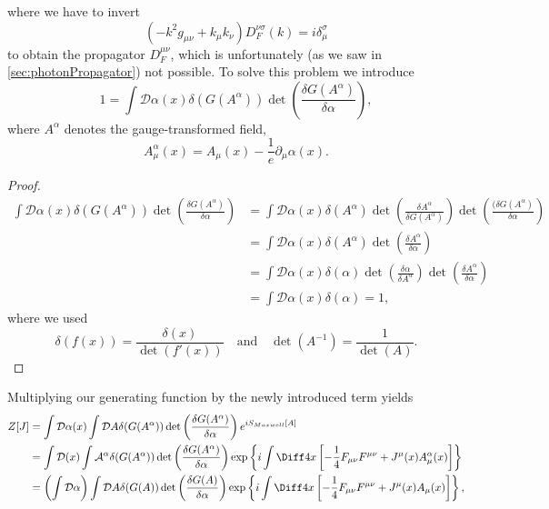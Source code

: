 where we have to invert
\begin{equation}
	(-k^2 g_{\mu\nu} + k_\mu k_\nu) D^{\nu \sigma}_F (k) = i \delta_\mu^\sigma
\end{equation}
to obtain the propagator $D^{\mu\nu}_F$, which is unfortunately (as we saw in \ref{sec:photonPropagator}) not possible. To solve this problem we introduce
\begin{equation}
	1 = \int \mathcal{D} \alpha(x) \delta(G(A^\alpha)) \det\left(\frac{\delta G(A^\alpha)}{\delta\alpha}\right),
\end{equation}
where $A^\alpha$ denotes the gauge-transformed field, 
\begin{equation}
	A^\alpha_\mu(x) = A_\mu(x) - \frac{1}{e} \partial_\mu \alpha(x).
\end{equation}
\begin{proof}
\begin{align}
	\int \mathcal{D} \alpha(x) \delta(G(A^\alpha)) \det\left(\frac{\delta G(A^\alpha)}{\delta\alpha}\right) &= \int\mathcal{D}\alpha(x) \delta(A^\alpha) \det\left(\frac{\delta A^\alpha}{\delta G(A^\alpha)}\right) \det\left(\frac{(\delta G(A^\alpha)}{\delta \alpha}\right) \\
	&= \int\mathcal{D}\alpha(x) \delta(A^\alpha) \det\left(\frac{\delta A^\alpha}{\delta \alpha}\right) \\
	&= \int\mathcal{D}\alpha(x) \delta(\alpha) \det\left(\frac{\delta \alpha}{\delta A^\alpha}\right) \det\left(\frac{\delta A^\alpha}{\delta \alpha}\right) \\
	&= \int \mathcal{D}\alpha(x) \delta(\alpha) = 1,
\end{align}
where we used 
\begin{equation}
	\delta(f(x)) = \frac{\delta(x)}{\det (f'(x))} \quad \text{and} \quad \det(A^{-1}) = \frac{1}{\det(A)}.
\end{equation}
\end{proof}
Multiplying our generating function by the newly introduced term yields
\begin{align}
	Z[J] &= \int \mathcal{D} \alpha(x) \int \mathcal{D} A \delta(G(A^\alpha)) \det\left(\frac{\delta G(A^\alpha)}{\delta \alpha}\right) e^{iS_{Maxwell}[A]} \\
	&= \int \mathcal{D}(x) \int \mathcal{A^\alpha} \delta(G(A^\alpha)) \det\left(\frac{\delta G(A^\alpha)}{\delta \alpha}\right) \exp \left\{ i \int\Diff4x \left[- \frac{1}{4}F_{\mu\nu}F^{\mu\nu} + J^\mu(x) A^\alpha_\mu(x)\right]\right\} \\
	&= \left(\int\mathcal{D}\alpha\right) \int\mathcal{D}A\delta(G(A)) \det\left(\frac{\delta G(A)}{\delta\alpha}\right) \exp\left\{i\int\Diff4x\left[-\frac{1}{4}F_{\mu\nu}F^{\mu\nu} + J^\mu(x)A_\mu(x)\right]\right\},
\end{align}
